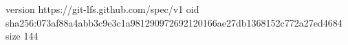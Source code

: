 version https://git-lfs.github.com/spec/v1
oid sha256:073af88a4abb3c9e3c1a981290972692120166ae27db1368152c772a27ed4684
size 144
